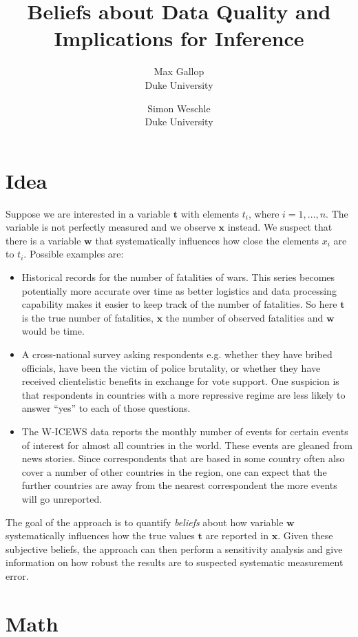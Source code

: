 \documentclass[fignum,letterpaper,12pt]{article}
\title{Beliefs about Data Quality and Implications for Inference}
\author{
Max Gallop\\
	Duke University\\
\and
Simon Weschle\\
	Duke University\\
}
\begin{document}
\maketitle
\thispagestyle{empty}

\section{Idea}
\noindent
Suppose we are interested in a variable $\mathbf{t}$ with elements $t_i$, where $i=1, \dots, n$. The variable is not perfectly measured and we observe $\mathbf{x}$ instead. We suspect that there is a variable $\mathbf{w}$ that systematically influences how close the elements $x_i$ are to $t_i$. Possible examples are:
\begin{itemize}
\item Historical records for the number of fatalities of wars. This series becomes potentially more accurate over time as better logistics and data processing capability makes it easier to keep track of the number of fatalities. So here $\mathbf{t}$ is the true number of fatalities, $\mathbf{x}$ the number of observed fatalities and $\mathbf{w}$ would be time.
\item A cross-national survey asking respondents e.g. whether they have bribed officials, have been the victim of police brutality, or whether they have received clientelistic benefits in exchange for vote support. One suspicion is that respondents in countries with a more repressive regime are less likely to answer ``yes'' to each of those questions.
\item The W-ICEWS data reports the monthly number of events for certain events of interest for almost all countries in the world. These events are gleaned from news stories. Since correspondents that are based in some country often also cover a number of other countries in the region, one can expect that the further countries are away from the nearest correspondent the more events will go unreported. 
\end{itemize}
The goal of the approach is to quantify \textit{beliefs} about how variable $\mathbf{w}$ systematically influences how the true values $\mathbf{t}$ are reported in $\mathbf{x}$. Given these subjective beliefs, the approach can then perform a sensitivity analysis and give information on how robust the results are to suspected systematic measurement error.


\section{Math}
\end{document}
